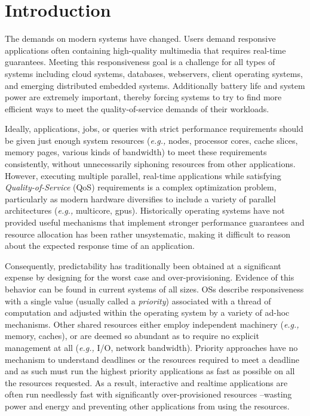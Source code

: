 \section{Introduction}


The demands on modern systems have changed.  Users demand responsive applications often containing high-quality multimedia that requires real-time guarantees.  Meeting this responsiveness goal is a challenge for all types of systems including cloud systems, databases, webservers, client operating systems, and emerging distributed embedded systems. Additionally battery life and system power are extremely important, thereby forcing systems to try to find more efficient ways to meet the quality-of-service demands of their workloads.

Ideally, applications, jobs, or queries with strict performance requirements should be given just enough system resources (\emph{e.g.,} nodes, processor cores, cache slices, memory pages, various kinds of bandwidth) to meet these requirements consistently, without unnecessarily siphoning resources from other applications. However, executing multiple parallel, real-time applications while satisfying  \emph{Quality-of-Service} (QoS) requirements is a complex optimization problem, particularly as modern hardware diversifies to include a variety of parallel architectures (\emph{e.g.,} multicore, gpus).  Historically operating systems have not provided useful mechanisms that implement stronger performance guarantees and resource allocation has been rather unsystematic, making it difficult to reason about the expected response time of an application. 

Consequently, predictability has traditionally been obtained at a significant expense by designing for the worst case and over-provisioning.  Evidence of this behavior can be found in current systems of all sizes.  OSs describe responsiveness with a single value (usually called a \emph{priority}) associated with a thread of computation and adjusted within the operating system by a variety of ad-hoc mechanisms. Other shared resources either employ independent machinery (\emph{e.g.,} memory, caches), or are deemed so abundant as to require no explicit management at all (\emph{e.g.,} I/O, network bandwidth).
 Priority approaches have no mechanism to understand deadlines or the resources required to meet a deadline and as such must run the highest priority applications as fast as possible on all the resources requested.   As a result, interactive and realtime applications are often run needlessly fast with significantly over-provisioned resources --wasting power and energy and preventing other applications from using the resources.  

